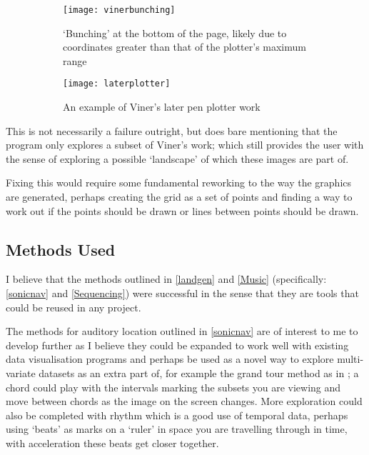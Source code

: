 \begin{figure}[H]
    \centering
    \begin{subfigure}[t]{0.49\textwidth}
        \centering
        \texttt{[image: vinerbunching]}
        \caption{`Bunching' at the bottom of the page, likely due to coordinates
        greater than that of the plotter's maximum range}
    \end{subfigure}
    \hfill
    \begin{subfigure}[t]{0.49\textwidth}
        \centering
        \texttt{[image: laterplotter]}
        \caption{An example of Viner's later pen plotter work}
    \end{subfigure}
    \caption{}
\end{figure}

This is not necessarily a failure outright, but does bare mentioning that the
program only explores a subset of Viner's work; which still provides the user
with the sense of exploring a possible `landscape' of which these images are
part of.

Fixing this would require some fundamental reworking to the way the graphics are
generated, perhaps creating the grid as a set of points and finding a way to
work out if the points should be drawn or lines between points should be drawn.

\subsection{Methods Used}
I believe that the methods outlined in \autoref{landgen} and
\autoref{Music} (specifically: \autoref{sonicnav} and
\autoref{Sequencing}) were successful in the sense that they are tools that
could be reused in any project.

The methods for auditory location outlined in \autoref{sonicnav} are of interest
to me to develop further as I believe they could be expanded to work well with
existing data visualisation programs and perhaps be used as a novel way to
explore multi-variate datasets as an extra part of, for example the grand tour
method as in \citep{asimov1985grand}; a chord could play with the intervals
marking the subsets you are viewing and move between chords as the image on the
screen changes. More exploration could also be completed with rhythm which is a
good use of temporal data, perhaps using `beats' as marks on a `ruler' in space
you are travelling through in time, with acceleration these beats get closer
together.

